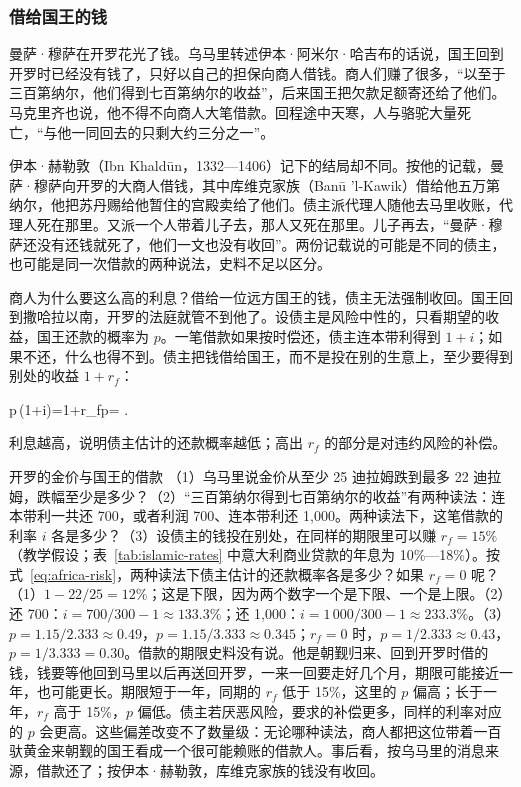 \subsubsection{借给国王的钱}
曼萨·穆萨在开罗花光了钱。乌马里转述伊本·阿米尔·哈吉布的话说，国王回到开罗时已经没有钱了，只好以自己的担保向商人借钱。商人们赚了很多，“以至于三百第纳尔，他们得到七百第纳尔的收益”，后来国王把欠款足额寄还给了他们\cite{umari1927}。马克里齐也说，他不得不向商人大笔借款。回程途中天寒，人与骆驼大量死亡，“与他一同回去的只剩大约三分之一”\cite{umari1927}。

伊本·赫勒敦（Ibn Khaldūn，1332—1406）记下的结局却不同。按他的记载，曼萨·穆萨向开罗的大商人借钱，其中库维克家族（Banū 'l-Kawik）借给他五万第纳尔，他把苏丹赐给他暂住的宫殿卖给了他们。债主派代理人随他去马里收账，代理人死在那里。又派一个人带着儿子去，那人又死在那里。儿子再去，“曼萨·穆萨还没有还钱就死了，他们一文也没有收回”\cite{umari1927}。两份记载说的可能是不同的债主，也可能是同一次借款的两种说法，史料不足以区分。

商人为什么要这么高的利息？借给一位远方国王的钱，债主无法强制收回。国王回到撒哈拉以南，开罗的法庭就管不到他了。设债主是风险中性的，只看期望的收益，国王还款的概率为 $p$。一笔借款如果按时偿还，债主连本带利得到 $1+i$；如果不还，什么也得不到。债主把钱借给国王，而不是投在别的生意上，至少要得到别处的收益 $1+r_f$：
\begin{keyeq}
p\,(1+i)=1+r_f\qquad\Longrightarrow\qquad p= .\label{eq:africa-risk}
\end{keyeq}
利息越高，说明债主估计的还款概率越低；高出 $r_f$ 的部分是对违约风险的补偿。

\begin{example}{开罗的金价与国王的借款}\label{ex:africa-gold}
（1）乌马里说金价从至少 25 迪拉姆跌到最多 22 迪拉姆，跌幅至少是多少？（2）“三百第纳尔得到七百第纳尔的收益”有两种读法：连本带利一共还 700，或者利润 700、连本带利还 1,000。两种读法下，这笔借款的利率 $i$ 各是多少？（3）设债主的钱投在别处，在同样的期限里可以赚 $r_f=15\%$（教学假设；表~\ref{tab:islamic-rates} 中意大利商业贷款的年息为 10\%—18\%）。按式~\eqref{eq:africa-risk}，两种读法下债主估计的还款概率各是多少？如果 $r_f=0$ 呢？
\solution （1）$1-22/25=12\%$；这是下限，因为两个数字一个是下限、一个是上限。（2）还 700：$i=700/300-1\approx133.3\%$；还 1,000：$i=1\,000/300-1\approx233.3\%$。（3）$p=1.15/2.333\approx0.49$，$p=1.15/3.333\approx0.345$；$r_f=0$ 时，$p=1/2.333\approx0.43$，$p=1/3.333=0.30$。借款的期限史料没有说。他是朝觐归来、回到开罗时借的钱，钱要等他回到马里以后再送回开罗，一来一回要走好几个月，期限可能接近一年，也可能更长。期限短于一年，同期的 $r_f$ 低于 15\%，这里的 $p$ 偏高；长于一年，$r_f$ 高于 15\%，$p$ 偏低。债主若厌恶风险，要求的补偿更多，同样的利率对应的 $p$ 会更高。这些偏差改变不了数量级：无论哪种读法，商人都把这位带着一百驮黄金来朝觐的国王看成一个很可能赖账的借款人。事后看，按乌马里的消息来源，借款还了；按伊本·赫勒敦，库维克家族的钱没有收回。
\end{example}

